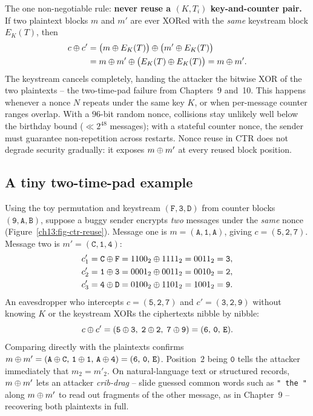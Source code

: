 \begin{trapbox}
The one non-negotiable rule: \textbf{never reuse a $(K, T_i)$ key-and-counter pair.} If two plaintext blocks $m$ and $m'$ are ever XORed with the \emph{same} keystream block $E_K(T)$, then
\begin{align*}
c \oplus c' &= \big(m \oplus E_K(T)\big) \oplus \big(m' \oplus E_K(T)\big) \\
          &= m \oplus m' \oplus \big(E_K(T) \oplus E_K(T)\big) = m \oplus m'.
\end{align*}
The keystream cancels completely, handing the attacker the bitwise XOR of the two plaintexts -- the two-time-pad failure from Chapters~9 and~10. This happens whenever a nonce $N$ repeats under the same key $K$, or when per-message counter ranges overlap. With a $96$-bit random nonce, collisions stay unlikely well below the birthday bound ($\ll 2^{48}$ messages); with a stateful counter nonce, the sender must guarantee non-repetition across restarts. Nonce reuse in CTR does not degrade security gradually: it exposes $m \oplus m'$ at every reused block position.
\end{trapbox}

\subsection{A tiny two-time-pad example}

Using the toy permutation and keystream $(\mathtt{F},\mathtt{3},\mathtt{D})$ from counter blocks $(\mathtt{9},\mathtt{A},\mathtt{B})$, suppose a buggy sender encrypts \emph{two} messages under the \emph{same} nonce (Figure~\ref{ch13:fig-ctr-reuse}). Message one is $m = (\mathtt{A},\mathtt{1},\mathtt{A})$, giving $c = (\mathtt{5},\mathtt{2},\mathtt{7})$. Message two is $m' = (\mathtt{C},\mathtt{1},\mathtt{4})$:
\begin{align*}
c'_1 &= \mathtt{C}\oplus\mathtt{F} = 1100_2 \oplus 1111_2 = 0011_2 = \mathtt{3},\\
c'_2 &= \mathtt{1}\oplus\mathtt{3} = 0001_2 \oplus 0011_2 = 0010_2 = \mathtt{2},\\
c'_3 &= \mathtt{4}\oplus\mathtt{D} = 0100_2 \oplus 1101_2 = 1001_2 = \mathtt{9}.
\end{align*}
An eavesdropper who intercepts $c = (\mathtt{5},\mathtt{2},\mathtt{7})$ and $c' = (\mathtt{3},\mathtt{2},\mathtt{9})$ without knowing $K$ or the keystream XORs the ciphertexts nibble by nibble:
\[
c \oplus c' = (\mathtt{5}\oplus\mathtt{3},\; \mathtt{2}\oplus\mathtt{2},\; \mathtt{7}\oplus\mathtt{9}) = (\mathtt{6},\,\mathtt{0},\,\mathtt{E}).
\]
Comparing directly with the plaintexts confirms $m \oplus m' = (\mathtt{A}\oplus\mathtt{C},\,\mathtt{1}\oplus\mathtt{1},\,\mathtt{A}\oplus\mathtt{4}) = (\mathtt{6},\,\mathtt{0},\,\mathtt{E})$. Position~$2$ being $\mathtt{0}$ tells the attacker immediately that $m_2 = m'_2$. On natural-language text or structured records, $m \oplus m'$ lets an attacker \emph{crib-drag} -- slide guessed common words such as \texttt{" the "} along $m \oplus m'$ to read out fragments of the other message, as in Chapter~9 -- recovering both plaintexts in full.

